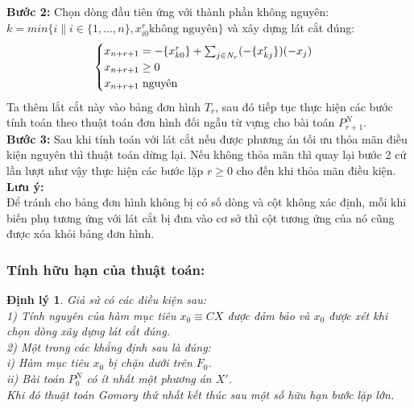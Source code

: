 \documentclass[12pt,a4paper]{report}
\newtheorem{dl}{Định lý}[chapter]
\begin{document}
\textbf{Bước 2:}
Chọn dòng đầu tiên ứng với thành phần không nguyên:\\
$k=min\{i\|i\in \{1,...,n\},x_{i0}^r \text{không nguyên}\}$ và xây dựng lát cắt đúng:\\
$$   \begin{cases}\label{latcat}
    x_{n+r+1}= -\{x_{k0}^r\} + \sum_{j\in N_r}(-\{x_{kj}^r\} )(-x_j)\\
    x_{n+r+1} \ge 0\\
    x_{n+r+1} \hspace{0.1cm} \text{nguyên}
\end{cases}$$
Ta thêm lắt cắt này vào bảng đơn hình $T_r$, sau đó tiếp tục thực hiện các bước tính toán theo thuật toán đơn hình đối ngẫu từ vựng cho bài toán $P^N_{r+1}$.\\

\textbf{Bước 3:}
Sau khi tính toán với lát cắt nếu được phương án tối ưu thỏa mãn điều kiện nguyên thì thuật toán dừng lại. Nếu không thỏa mãn thì quay lại bước 2 cứ lần lượt như vậy thực hiện các bước lặp $r \ge 0$ cho đến khi thỏa mãn điều kiện.
\textbf{Lưu ý:}\\
Để tránh cho bảng đơn hình không bị có số dòng và cột không xác định, mỗi khi biến phụ tương ứng với lát cắt bị đưa vào cơ sở thì cột tương ứng của nó cũng được xóa khỏi bảng đơn hình.
\subsubsection{Tính hữu hạn của thuật toán:}
\begin{dl}
Giả sử có các điều kiện sau:\\
1) Tính nguyên của hàm mục tiêu $x_0\equiv CX$ được đảm bảo và $x_0$ được xét khi chọn dòng xây dựng lát cắt đúng.\\
2) Một trong các khẳng định sau là đúng:\\
i) Hàm mục tiêu $x_0$ bị chặn dưới trên $F_0$.\\ 
ii) Bài toán $P^N_0$ có ít nhất một phương án $X'$.\\
 Khi đó thuật toán Gomory thứ nhất kết thúc sau một số hữu hạn bước lặp lớn.
 \end{dl}
 
\end{document}
